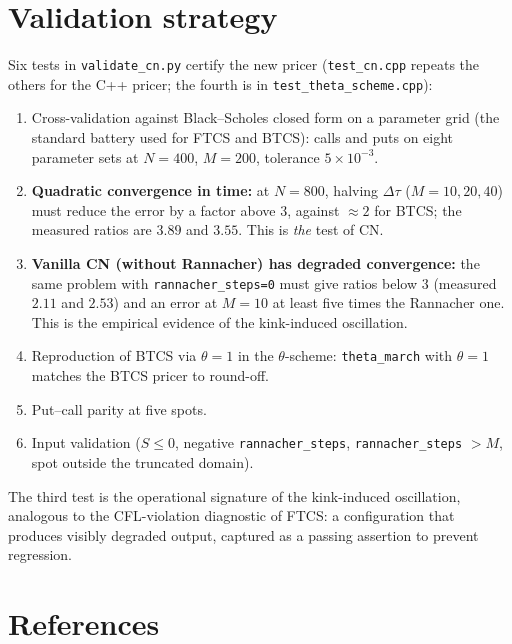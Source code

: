 \documentclass[11pt,a4paper]{article}
\begin{document}
\section{Validation strategy}

Six tests in \texttt{validate\_cn.py} certify the new pricer
(\texttt{test\_cn.cpp} repeats the others for the C++ pricer; the fourth
is in \texttt{test\_theta\_scheme.cpp}):
\begin{enumerate}[leftmargin=2em]
\item Cross-validation against Black--Scholes closed form on a
parameter grid (the standard battery used for FTCS and BTCS): calls
and puts on eight parameter sets at $N = 400$, $M = 200$, tolerance
$5\times10^{-3}$.
\item \textbf{Quadratic convergence in time:} at $N = 800$, halving
$\Delta\tau$ ($M = 10, 20, 40$) must reduce the error by a factor
above $3$, against $\approx 2$ for BTCS; the measured ratios are $3.89$
and $3.55$. This is \emph{the} test of CN.
\item \textbf{Vanilla CN (without Rannacher) has degraded convergence:}
the same problem with \texttt{rannacher\_steps=0} must give ratios
below $3$ (measured $2.11$ and $2.53$) and an error at $M = 10$ at least
five times the Rannacher one. This is the empirical evidence of the
kink-induced oscillation.
\item Reproduction of BTCS via $\theta = 1$ in the $\theta$-scheme:
\texttt{theta\_march} with $\theta = 1$ matches the BTCS pricer to
round-off.
\item Put--call parity at five spots.
\item Input validation ($S \le 0$, negative \texttt{rannacher\_steps},
\texttt{rannacher\_steps} $> M$, spot outside the truncated domain).
\end{enumerate}

The third test is the operational signature of the kink-induced
oscillation, analogous to the CFL-violation diagnostic of FTCS: a
configuration that produces visibly degraded output, captured as a
passing assertion to prevent regression.

\section*{References}
\end{document}
